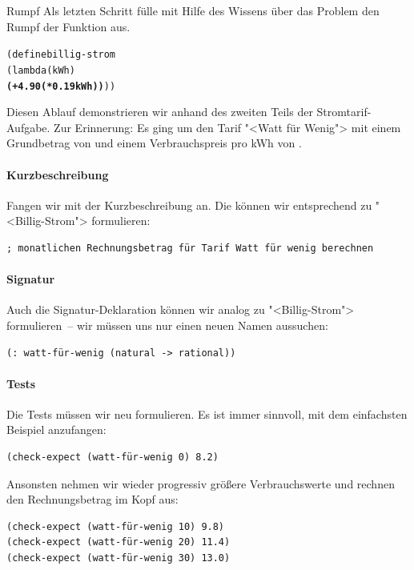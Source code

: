 \begin{konstruktionsanleitung}{Rumpf}
  \label{ka:rumpf}
  Als letzten Schritt fülle mit Hilfe des Wissens über das Problem
  den Rumpf der Funktion aus.
\begin{alltt}
(define billig-strom
  (lambda (kWh)
    \textbf{(+ 4.90 (* 0.19 kWh))}))
\end{alltt}
\end{konstruktionsanleitung}

Diesen Ablauf demonstrieren wir anhand des zweiten Teils der
Stromtarif-Aufgabe.
Zur Erinnerung:  Es ging um den Tarif
"<Watt für Wenig"> mit einem Grundbetrag von  und einem
Verbrauchspreis pro kWh von .

\paragraph{Kurzbeschreibung}

Fangen wir mit der Kurzbeschreibung an.  Die können wir entsprechend
zu "<Billig-Strom"> formulieren:
\begin{verbatim}
; monatlichen Rechnungsbetrag für Tarif Watt für wenig berechnen
\end{verbatim}

\paragraph{Signatur}

Auch die Signatur-Deklaration können wir analog zu "<Billig-Strom">
formulieren~-- wir müssen uns nur einen neuen Namen aussuchen:
%
\begin{verbatim}
(: watt-für-wenig (natural -> rational))
\end{verbatim}

\paragraph{Tests}

Die Tests müssen wir neu formulieren.  Es ist immer sinnvoll, mit dem
einfachsten Beispiel anzufangen:
\begin{verbatim}
(check-expect (watt-für-wenig 0) 8.2)
\end{verbatim}

Ansonsten nehmen wir wieder progressiv größere Verbrauchswerte und
rechnen den Rechnungsbetrag im Kopf aus:
%
\begin{verbatim}
(check-expect (watt-für-wenig 10) 9.8)
(check-expect (watt-für-wenig 20) 11.4)
(check-expect (watt-für-wenig 30) 13.0)
\end{verbatim}

